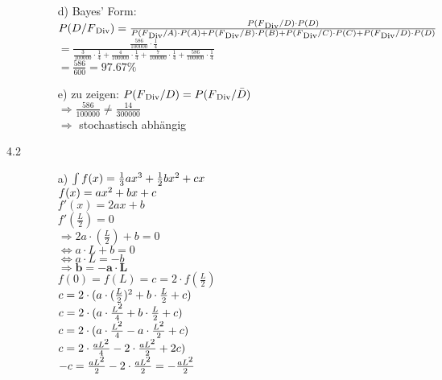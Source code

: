 \documentclass[a4paper]{article}
\begin{document}
\begin{description}
\begin{itemize}
				\item[d)] Bayes' Form:\\
									$P(D/F\textsubscript{Div})=\frac{P(F\textsubscript{Div}/D) \cdot P(D)}{P(F\textsubscript{Div}/A) \cdot P(A) + P(F\textsubscript{Div}/B) \cdot P(B) + P(F\textsubscript{Div}/C) \cdot P(C) + P(F\textsubscript{Div}/D)\cdot P(D)}$\\
									
									$=\frac{\frac{586}{100000}\cdot \frac{1}{4}}{\frac{3}{100000}\cdot \frac{1}{4} + \frac{4}{100000}\cdot \frac{1}{4} + \frac{7}{100000}\cdot \frac{1}{4} + \frac{586}{100000}\cdot \frac{1}{4}}$\\
									
									$=\frac{586}{600}= 97.67\%$\\
									
				\item[e)] zu zeigen: $P(F\textsubscript{Div}/D) = P(F\textsubscript{Div}/\bar{D})$\\
				
									$\Rightarrow \frac{586}{100000} \neq \frac{14}{300000}$\\
									
									$\Rightarrow$ stochastisch abhängig 
				\end{itemize}

\item[4.2] 
				
			\begin{itemize}
				\item[a)] $\int f(x)=\frac{1}{3}ax\textsuperscript{3}+\frac{1}{2}bx\textsuperscript{2}+cx$\\
									$f(x)=ax\textsuperscript{2}+bx+c$\\
									$f'(x)=2ax+b$\\
									
									$f'(\frac{L}{2})=0$\\
									$\Rightarrow 2a\cdot (\frac{L}{2})+b=0$\\
									$\Leftrightarrow a\cdot L +b =0$\\
									$\Leftrightarrow a\cdot L = -b$\\
									$\Rightarrow \boldsymbol{b= -a\cdot L}$\\
									
									$f(0)=f(L)=c=2\cdot f(\frac{L}{2})$\\
									$c= 2\cdot (a\cdot (\frac{L}{2})\textsuperscript{2}+ b\cdot \frac{L}{2}+c)$\\
									$c= 2\cdot (a\cdot \frac{L\textsuperscript{2}}{4}+ b\cdot \frac{L}{2}+c)$\\
									$c= 2\cdot (a\cdot \frac{L\textsuperscript{2}}{4}- a \cdot \frac{L\textsuperscript{2}}{2}+c)$\\
									$c= 2\cdot \frac{aL\textsuperscript{2}}{4}- 2 \cdot \frac{aL\textsuperscript{2}}{2}+2c)$\\
									$-c=\frac{aL\textsuperscript{2}}{2}-2\cdot \frac{aL\textsuperscript{2}}{2}= -	\frac{aL\textsuperscript{2}}{2}$\\
										

\end{itemize}
\end{description}
\end{document}
